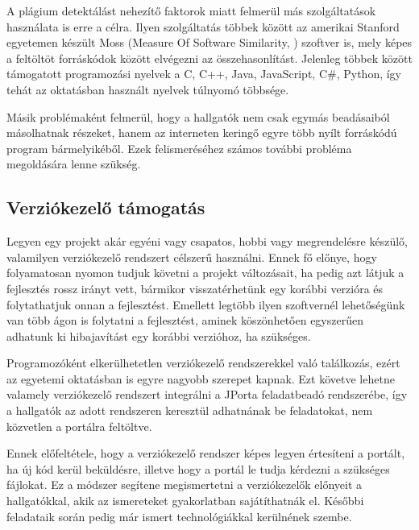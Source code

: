 A plágium detektálást nehezítő faktorok miatt felmerül más szolgáltatások használata is erre a célra. Ilyen szolgáltatás többek között az amerikai Stanford egyetemen készült Moss (Measure Of Software Similarity, \cite{Moss}) szoftver is, mely képes a feltöltöt forráskódok között elvégezni az összehasonlítást. Jelenleg többek között támogatott programozási nyelvek a C, C++, Java, JavaScript, C\#, Python, így tehát az oktatásban használt nyelvek túlnyomó többsége.

Másik problémaként felmerül, hogy a hallgatók nem csak egymás beadásaiból másolhatnak részeket, hanem az interneten keringő egyre több nyílt forráskódú program bármelyikéből. Ezek felismeréséhez számos további probléma megoldására lenne szükség.

\subsection{Verziókezelő támogatás}

Legyen egy projekt akár egyéni vagy csapatos, hobbi vagy megrendelésre készülő, valamilyen verziókezelő rendszert célszerű használni. Ennek fő előnye, hogy folyamatosan nyomon tudjuk követni a projekt változásait, ha pedig azt látjuk a fejlesztés rossz irányt vett, bármikor visszatérhetünk egy korábbi verzióra és folytathatjuk onnan a fejlesztést. Emellett legtöbb ilyen szoftvernél lehetőségünk van több ágon is folytatni a fejlesztést, aminek köszönhetően egyszerűen adhatunk ki hibajavítást egy korábbi verzióhoz, ha szükséges.

Programozóként elkerülhetetlen verziókezelő rendszerekkel való találkozás, ezért az egyetemi oktatásban is egyre nagyobb szerepet kapnak. Ezt követve lehetne valamely verziókezelő rendszert integrálni a JPorta feladatbeadó rendszerébe, így a hallgatók az adott rendszeren keresztül adhatnának be feladatokat, nem közvetlen a portálra feltöltve.

Ennek előfeltétele, hogy a verziókezelő rendszer képes legyen értesíteni a portált, ha új kód kerül beküldésre, illetve hogy a portál le tudja kérdezni a szükséges fájlokat. Ez a módszer segítene megismertetni a verziókezelők előnyeit a hallgatókkal, akik az ismereteket gyakorlatban sajátíthatnák el. Későbbi feladataik során pedig már ismert technológiákkal kerülnének szembe.